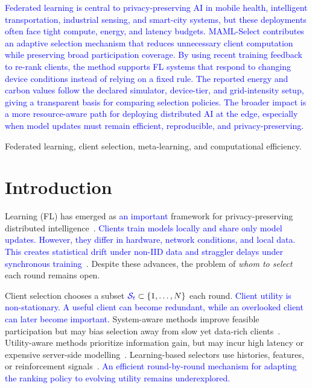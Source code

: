 \documentclass[journal]{IEEEtran}
\newcommand{\revision}[1]{\textcolor{blue}{#1}}
\begin{document}
\renewcommand\IEEEkeywordsname{Impact Statement}
\begin{IEEEkeywords}
\revision{Federated learning is central to privacy-preserving AI in mobile health, intelligent transportation, industrial sensing, and smart-city systems, but these deployments often face tight compute, energy, and latency budgets. MAML-Select contributes an adaptive selection mechanism that reduces unnecessary client computation while preserving broad participation coverage. By using recent training feedback to re-rank clients, the method supports FL systems that respond to changing device conditions instead of relying on a fixed rule. The reported energy and carbon values follow the declared simulator, device-tier, and grid-intensity setup, giving a transparent basis for comparing selection policies. The broader impact is a more resource-aware path for deploying distributed AI at the edge, especially when model updates must remain efficient, reproducible, and privacy-preserving.}


\end{IEEEkeywords}
\renewcommand\IEEEkeywordsname{Index Terms}
\begin{IEEEkeywords}
Federated learning, client selection, meta-learning, and computational efficiency.
\end{IEEEkeywords}
\section{Introduction}

 Learning (FL) has emerged as \revision{an important} framework for privacy-preserving distributed intelligence~\cite{mcmahan2017communication}. \revision{Clients train models locally and share only model updates. However, they differ in hardware, network conditions, and local data. This creates statistical drift under non-IID data and straggler delays under synchronous training}~\cite{karimireddy2020scaffold,mai2024study,tapwal2026stragglers,forootani2026asynchronous,borazjani2026redefining}. Despite these advances, the problem of \textit{whom to select} each round remains open.

Client selection chooses a subset $\revision{\mathcal{S}_t} \subset \{1, \ldots, N\}$ each round. \revision{Client utility is non-stationary. A useful client can become redundant, while an overlooked client can later become important.} System-aware methods improve feasible participation but may bias selection away from slow yet data-rich clients~\cite{nishio2019client,chai2020tifl}. Utility-aware methods prioritize information gain, but may incur high latency or expensive server-side modelling~\cite{lai2021oort,tang2022fedcor,xu2024federated,yan2023criticalfl,ning2024fedgcs}. Learning-based selectors use histories, features, or reinforcement signals~\cite{wang2020optimizing,pan2024contextual,kazemi2026robust}. \revision{An efficient round-by-round mechanism for adapting the ranking policy to evolving utility remains underexplored.}
\end{document}
